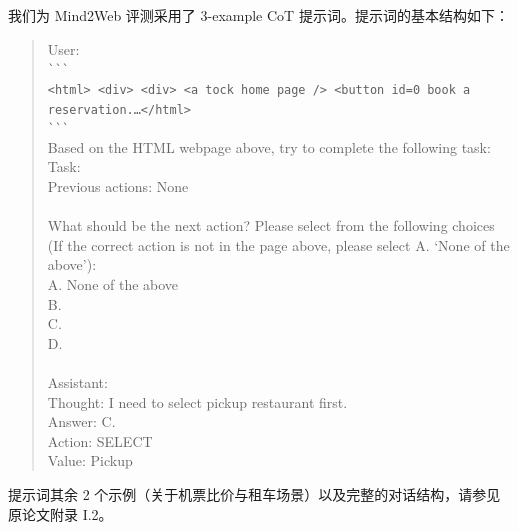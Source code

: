 我们为 Mind2Web 评测采用了 3-example CoT 提示词。提示词的基本结构如下：
\begin{quote}\small\ttfamily
User:\\
\verb|```|\\
\texttt{<html> <div> <div> <a tock home page /> <button id=0 book a
reservation.\dots</html>}\\
\verb|```|\\
Based on the HTML webpage above, try to complete the following task:\\
Task: \\
Previous actions: None\\
\\
What should be the next action? Please select from the following choices
(If the correct action is not in the page above, please select A. `None
of the above'):\\
A. None of the above\\
B. \\
C. \\
D. \\
\\
Assistant:\\
Thought: I need to select pickup restaurant first.\\
Answer: C.\\
Action: SELECT\\
Value: Pickup
\end{quote}

提示词其余 2 个示例（关于机票比价与租车场景）以及完整的对话结构，请参见
原论文附录 I.2。
